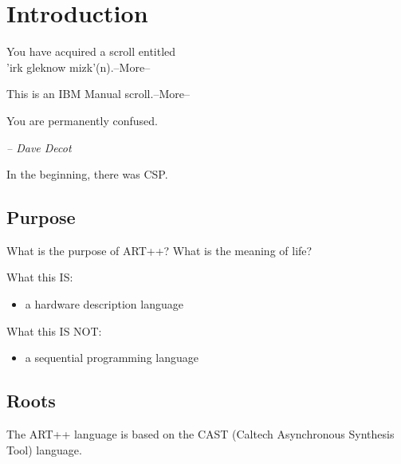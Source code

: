 
\chapter{Introduction}
\label{sec:intro}

\begin{flushright}
{ \ttfamily
You have acquired a scroll entitled\\
'irk gleknow mizk'(n).--More--

\medskip
This is an IBM Manual scroll.--More--

\medskip
You are permanently confused.

\bigskip
}	%
{\itshape -- Dave Decot}
\end{flushright}


In the beginning, there was CSP\cite{ref:csp}.


\section{Purpose}
\label{sec:intro:purpose}

What is the purpose of ART++?
What is the meaning of life?

What this IS:
\begin{itemize}
\item a hardware description language
\end{itemize}

What this IS NOT:
\begin{itemize}
\item a sequential programming language
\end{itemize}

\section{Roots}
\label{sec:intro:roots}

The ART++ language is based on the CAST
(Caltech Asynchronous Synthesis Tool) language.  

